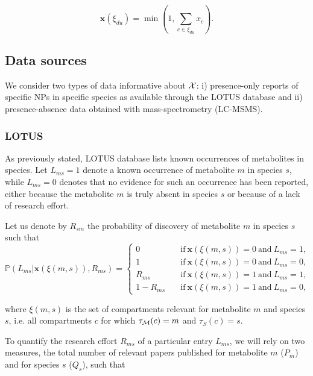 \documentclass[
11pt, %
oneside, %
english, %
singlespacing, %
headsepline, %
chapterinoneline, %
]{MastersDoctoralThesis} %
\def\P{\mathbb{P}}
\def\x{\boldsymbol{x}}
\def\M{{\cal M}}
\def\X{{\cal X}}
\begin{document}
	\begin{equation}
		\x(\xi_{du}) = \min \left(1, \sum_{c \in \xi_{du}} x_c \right).
	\end{equation}

	\subsection{Data sources}\label{subsec: data sources}
	We consider two types of data informative about $\X$: i) presence-only reports of specific NPs in specific species as available through the LOTUS database and ii) presence-absence data obtained with mass-spectrometry (LC-MSMS).
	
	\subsubsection{LOTUS}
	
	As previously stated, LOTUS database \cite{rutzLOTUSInitiativeOpen2022} lists known occurrences of metabolites in species. Let $L_{ms} = 1$ denote a known occurrence of metabolite $m$ in species $s$, while $L_{ms}=0$ denotes that no evidence for such an occurrence has been reported, either because the metabolite $m$ is truly absent in species $s$ or because of a lack of research effort.
	
	Let us denote by $R_{sm}$ the probability of discovery of metabolite $m$ in species $s$ such that
	\begin{equation}\label{eq:prob lotus given x and Rsm}
		\P(L_{ms}|\x(\xi(m,s)), R_{ms}) = 
		\begin{cases}
			0 \quad &\mathrm{if\ } \x(\xi(m,s))=0 \mathrm{\ and\ } L_{ms} = 1,\\
			1 \quad &\mathrm{if\ } \x(\xi(m,s))=0 \mathrm{\ and\ } L_{ms} = 0,\\
			R_{ms} \quad &\mathrm{if\ } \x(\xi(m,s))=1 \mathrm{\ and\ } L_{ms} = 1,\\
			1- R_{ms} \quad &\mathrm{if\ } \x(\xi(m,s))=1 \mathrm{\ and\ } L_{ms} = 0,
		\end{cases}
	\end{equation}
	
	where $\xi(m,s)$ is the set of compartments relevant for metabolite $m$ and species $s$, i.e. all compartments $c$ for which $\tau_\M(c)=m$ and $\tau_S(c)=s$.
	
	To quantify the research effort $R_{ms}$ of a particular entry $L_{ms}$, we will rely on two measures, the total number of relevant papers published for metabolite $m$ ($P_m$) and for species $s$ ($Q_s$), such that
	
\end{document}
